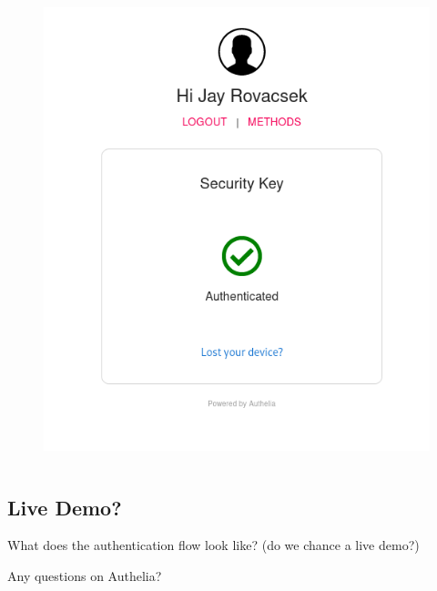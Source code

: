 \documentclass{beamer}
\begin{document}
\begin{frame}
\begin{columns}
\begin{column}{0.5\textwidth}
\begin{figure}
                \includegraphics[width=\textwidth,keepaspectratio]{../resources/2fa_options_alt.png}
            \end{figure}
        \end{column}
    \end{columns}
\end{frame}

\subsection{Live Demo?}

\begin{frame}
    \begin{center}
        What does the authentication flow look like? (do we chance a live demo?)
    \end{center}
\end{frame}

\begin{frame}
    \begin{center}
        Any questions on Authelia?
    \end{center}
\end{frame}
\end{document}
